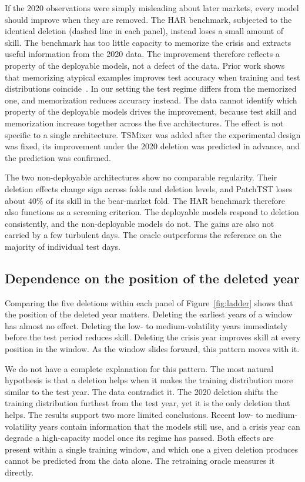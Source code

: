 If the 2020 observations were simply misleading about later markets,
every model should improve when they are removed. The HAR benchmark,
subjected to the identical deletion (dashed line in each panel),
instead loses a small amount of skill. The benchmark has too little
capacity to memorize the crisis and extracts useful information from
the 2020 data. The improvement therefore reflects a property of the
deployable models, not a defect of the data. Prior work shows
that memorizing atypical examples improves test accuracy when
training and test distributions
coincide~\cite{feldman2020memorization}. In our setting the test
regime differs from the memorized one, and memorization reduces
accuracy instead. The data cannot identify which property of the
deployable models drives the improvement, because test skill and
memorization increase together across the five architectures. The
effect is not specific to a single architecture. TSMixer was added
after the experimental design was fixed, its improvement under the
2020 deletion was predicted in advance, and the prediction was
confirmed.

The two non-deployable architectures show no comparable
regularity. Their deletion effects change sign across folds and
deletion levels, and PatchTST loses about $40\%$ of its skill in the
bear-market fold. The HAR benchmark therefore also functions as a
screening criterion. The deployable models respond to deletion
consistently, and the non-deployable models do not. The gains
are also not carried by a few turbulent days. The oracle
outperforms the reference on the majority of individual test days.

\subsection{Dependence on the position of the deleted year}

Comparing the five deletions within each panel of
Figure~\ref{fig:ladder} shows that the position of the deleted year
matters. Deleting the earliest years of a window has almost no
effect. Deleting the low- to medium-volatility years immediately
before the test period reduces skill. Deleting the crisis year improves skill at
every position in the window. As the window slides forward, this
pattern moves with it.

We do not have a complete explanation for this pattern. The most
natural hypothesis is that a deletion helps when it makes the
training distribution more similar to the test year. The data
contradict it. The 2020 deletion shifts the training distribution
furthest from the test year, yet it is the only deletion that helps.
The results support two more limited conclusions. Recent low- to
medium-volatility years contain information that the models still
use, and a crisis year can degrade a high-capacity model once its
regime has passed.
Both effects are present within a single training window, and which
one a given deletion produces cannot be predicted from the data
alone. The retraining oracle measures it directly.

